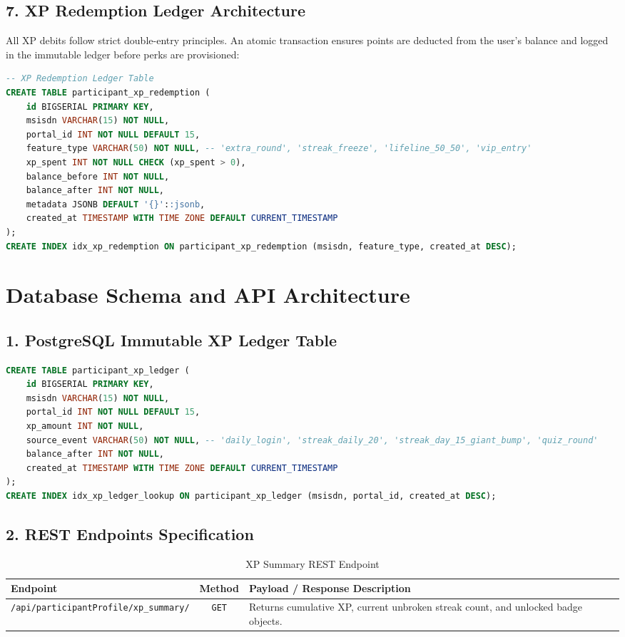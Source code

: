 \subsection{7. XP Redemption Ledger Architecture}
All XP debits follow strict double-entry principles. An atomic transaction ensures points are deducted from the user's balance and logged in the immutable ledger before perks are provisioned:

\begin{lstlisting}[language=SQL, caption={PostgreSQL Schema for XP Redemption and Feature Debits}]
-- XP Redemption Ledger Table
CREATE TABLE participant_xp_redemption (
    id BIGSERIAL PRIMARY KEY,
    msisdn VARCHAR(15) NOT NULL,
    portal_id INT NOT NULL DEFAULT 15,
    feature_type VARCHAR(50) NOT NULL, -- 'extra_round', 'streak_freeze', 'lifeline_50_50', 'vip_entry'
    xp_spent INT NOT NULL CHECK (xp_spent > 0),
    balance_before INT NOT NULL,
    balance_after INT NOT NULL,
    metadata JSONB DEFAULT '{}'::jsonb,
    created_at TIMESTAMP WITH TIME ZONE DEFAULT CURRENT_TIMESTAMP
);
CREATE INDEX idx_xp_redemption ON participant_xp_redemption (msisdn, feature_type, created_at DESC);
\end{lstlisting}

\section{Database Schema and API Architecture}

\subsection{1. PostgreSQL Immutable XP Ledger Table}
\begin{lstlisting}[language=SQL, caption={PostgreSQL Schema for XP Ledger}]
CREATE TABLE participant_xp_ledger (
    id BIGSERIAL PRIMARY KEY,
    msisdn VARCHAR(15) NOT NULL,
    portal_id INT NOT NULL DEFAULT 15,
    xp_amount INT NOT NULL,
    source_event VARCHAR(50) NOT NULL, -- 'daily_login', 'streak_daily_20', 'streak_day_15_giant_bump', 'quiz_round'
    balance_after INT NOT NULL,
    created_at TIMESTAMP WITH TIME ZONE DEFAULT CURRENT_TIMESTAMP
);
CREATE INDEX idx_xp_ledger_lookup ON participant_xp_ledger (msisdn, portal_id, created_at DESC);
\end{lstlisting}

\subsection{2. REST Endpoints Specification}
\begin{table}[htbp]
\centering
\small
\begin{tabular}{|p{6.2cm}|c|p{7.5cm}|}
\hline
\rowcolor{primaryBlue!15}
\textbf{Endpoint} & \textbf{Method} & \textbf{Payload / Response Description} \\ \hline
\texttt{/api/participantProfile/}\newline\texttt{xp\_summary/} & \texttt{GET} & Returns cumulative XP, current unbroken streak count, and unlocked badge objects. \\ \hline
\end{tabular}
\caption{XP Summary REST Endpoint}
\end{table}

